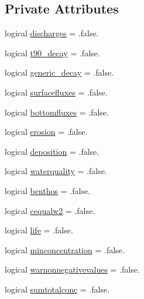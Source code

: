 \subsection*{Private Attributes}
\begin{DoxyCompactItemize}
\item 
logical \mbox{\hyperlink{structmodulereservoirs_1_1t__computeoptions_af6254a7d06d4ae25b3574cd4336e5833}{discharges}} = .false.
\item 
logical \mbox{\hyperlink{structmodulereservoirs_1_1t__computeoptions_ae8f1c38c22eae1dc04cdf37bd3ee2727}{t90\+\_\+decay}} = .false.
\item 
logical \mbox{\hyperlink{structmodulereservoirs_1_1t__computeoptions_ad103b91b7de4ada5cb47c3c10a8fc28d}{generic\+\_\+decay}} = .false.
\item 
logical \mbox{\hyperlink{structmodulereservoirs_1_1t__computeoptions_a6d22ae2303f20156f0c8e9430e9bdfed}{surfacefluxes}} = .false.
\item 
logical \mbox{\hyperlink{structmodulereservoirs_1_1t__computeoptions_a8304523044edb9c7da520c9ee0d894ed}{bottomfluxes}} = .false.
\item 
logical \mbox{\hyperlink{structmodulereservoirs_1_1t__computeoptions_a911c01bd315e991700a1341d58209e9f}{erosion}} = .false.
\item 
logical \mbox{\hyperlink{structmodulereservoirs_1_1t__computeoptions_ae8a0b29937feebd3169970be481d45a0}{deposition}} = .false.
\item 
logical \mbox{\hyperlink{structmodulereservoirs_1_1t__computeoptions_a651296e84db335cee9f138fad0006d2d}{waterquality}} = .false.
\item 
logical \mbox{\hyperlink{structmodulereservoirs_1_1t__computeoptions_a9d9d6b84895cfdfd8bdad79bb1ba731e}{benthos}} = .false.
\item 
logical \mbox{\hyperlink{structmodulereservoirs_1_1t__computeoptions_a822f98f7df73336758b91b25c53d82a8}{cequalw2}} = .false.
\item 
logical \mbox{\hyperlink{structmodulereservoirs_1_1t__computeoptions_a64f81b776152021fe0fd8d8a577f20d4}{life}} = .false.
\item 
logical \mbox{\hyperlink{structmodulereservoirs_1_1t__computeoptions_ab8927105765ed65e299f28ff03291618}{minconcentration}} = .false.
\item 
logical \mbox{\hyperlink{structmodulereservoirs_1_1t__computeoptions_a2cf2a0421a0a3e9345040f24a4c719d5}{warnonnegativevalues}} = .false.
\item 
logical \mbox{\hyperlink{structmodulereservoirs_1_1t__computeoptions_a369ab4b140320395933bc81d74644ffa}{sumtotalconc}} = .false.

\end{DoxyCompactItemize}

